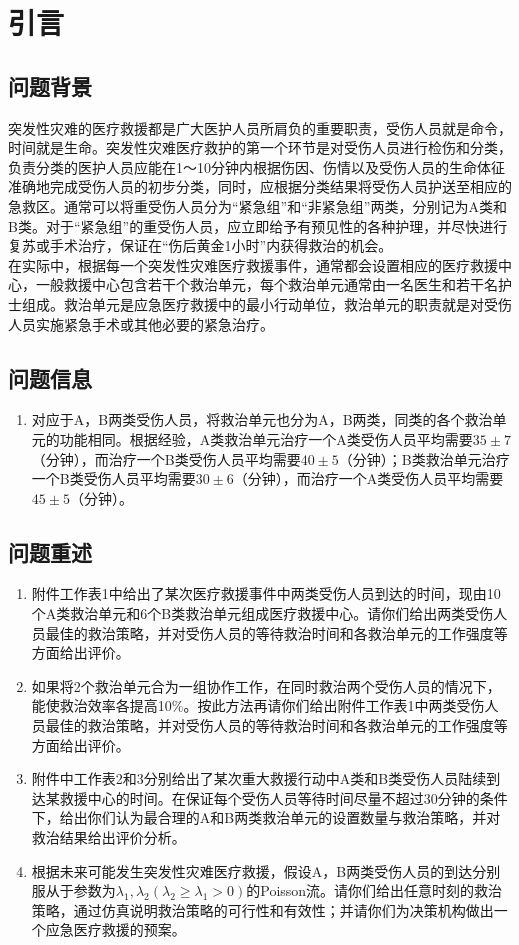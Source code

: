 \documentclass{article}
\begin{document}
\fi
\clearpage
\setcounter{section}{-1}
\section{引言}
\subsection{问题背景}
突发性灾难的医疗救援都是广大医护人员所肩负的重要职责，受伤人员就是命令，时间就是生命。突发性灾难医疗救护的第一个环节是对受伤人员进行检伤和分类，负责分类的医护人员应能在1～10分钟内根据伤因、伤情以及受伤人员的生命体征准确地完成受伤人员的初步分类，同时，应根据分类结果将受伤人员护送至相应的急救区。通常可以将重受伤人员分为“紧急组”和“非紧急组”两类，分别记为A类和B类。对于“紧急组”的重受伤人员，应立即给予有预见性的各种护理，并尽快进行复苏或手术治疗，保证在“伤后黄金1小时”内获得救治的机会。
\\\indent 在实际中，根据每一个突发性灾难医疗救援事件，通常都会设置相应的医疗救援中心，一般救援中心包含若干个救治单元，每个救治单元通常由一名医生和若干名护士组成。救治单元是应急医疗救援中的最小行动单位，救治单元的职责就是对受伤人员实施紧急手术或其他必要的紧急治疗。
\subsection{问题信息}
\begin{enumerate}
	\item 对应于A，B两类受伤人员，将救治单元也分为A，B两类，同类的各个救治单元的功能相同。根据经验，A类救治单元治疗一个A类受伤人员平均需要\(35\pm7\)（分钟），而治疗一个B类受伤人员平均需要\(40\pm5\)（分钟）；B类救治单元治疗一个B类受伤人员平均需要\(30\pm6\)（分钟），而治疗一个A类受伤人员平均需要\(45\pm5\)（分钟）。
\end{enumerate}
\subsection{问题重述}
\begin{enumerate}
	\item 附件工作表1中给出了某次医疗救援事件中两类受伤人员到达的时间，现由10个A类救治单元和6个B类救治单元组成医疗救援中心。请你们给出两类受伤人员最佳的救治策略，并对受伤人员的等待救治时间和各救治单元的工作强度等方面给出评价。
	\item 如果将2个救治单元合为一组协作工作，在同时救治两个受伤人员的情况下，能使救治效率各提高10\%。按此方法再请你们给出附件工作表1中两类受伤人员最佳的救治策略，并对受伤人员的等待救治时间和各救治单元的工作强度等方面给出评价。
	\item 附件中工作表2和3分别给出了某次重大救援行动中A类和B类受伤人员陆续到达某救援中心的时间。在保证每个受伤人员等待时间尽量不超过30分钟的条件下，给出你们认为最合理的A和B两类救治单元的设置数量与救治策略，并对救治结果给出评价分析。
	\item 根据未来可能发生突发性灾难医疗救援，假设A，B两类受伤人员的到达分别服从于参数为\(\lambda_1,\lambda_2(\lambda_2\geqslant\lambda_1>0)\)的Poisson流。请你们给出任意时刻的救治策略，通过仿真说明救治策略的可行性和有效性；并请你们为决策机构做出一个应急医疗救援的预案。
\end{enumerate}
\end{document}
